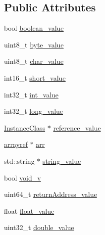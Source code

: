\subsection*{Public Attributes}
\begin{DoxyCompactItemize}
\item 
bool \hyperlink{unionLocal__var__Type__u_a8f386ab2284fc8e9828a136a9e15848b}{boolean\+\_\+value}
\item 
uint8\+\_\+t \hyperlink{unionLocal__var__Type__u_ad22519961e7ca09ba8135f4bab5cc677}{byte\+\_\+value}
\item 
uint8\+\_\+t \hyperlink{unionLocal__var__Type__u_ab245a6a8a84be391e7d1998b1eaf5f25}{char\+\_\+value}
\item 
int16\+\_\+t \hyperlink{unionLocal__var__Type__u_ac5a77877e9ddb59fe44eb9460facbec0}{short\+\_\+value}
\item 
int32\+\_\+t \hyperlink{unionLocal__var__Type__u_a26562ff158d1192e2caf14eebe1f2e51}{int\+\_\+value}
\item 
int32\+\_\+t \hyperlink{unionLocal__var__Type__u_a7968ab39ec644a73b48edc3d3c0886a5}{long\+\_\+value}
\item 
\hyperlink{classInstanceClass}{Instance\+Class} $\ast$ \hyperlink{unionLocal__var__Type__u_a5159fcf16992d633c01263fdebb6f00a}{reference\+\_\+value}
\item 
\hyperlink{heap_8hpp_a02f27b1f1856ad001bcd2be51cef4faf}{arrayref} $\ast$ \hyperlink{unionLocal__var__Type__u_a0f3d4309138ccd247a28eeaac2ecf3a8}{arr}
\item 
std\+::string $\ast$ \hyperlink{unionLocal__var__Type__u_ab9de5f06b94aff07f7e6187620c94935}{string\+\_\+value}
\item 
bool \hyperlink{unionLocal__var__Type__u_a8e62ef040320789080808dcdea5eb550}{void\+\_\+v}
\item 
uint64\+\_\+t \hyperlink{unionLocal__var__Type__u_aea0859d955fccc0e64ffb14966f91723}{return\+Address\+\_\+value}
\item 
float \hyperlink{unionLocal__var__Type__u_af9976abb511b20f4f30a43bb9199f3b1}{float\+\_\+value}
\item 
uint32\+\_\+t \hyperlink{unionLocal__var__Type__u_a9da402ea2473492fe9badcb562a4b117}{double\+\_\+value}
\end{DoxyCompactItemize}


